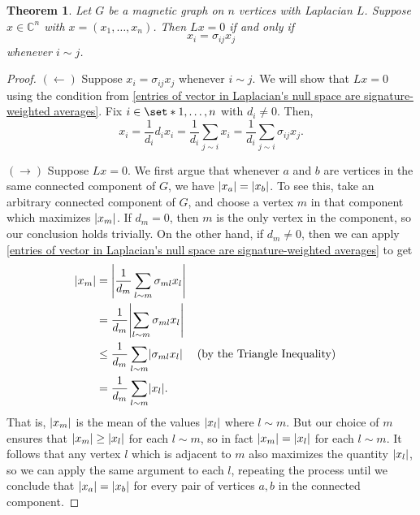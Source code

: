 \documentclass[12pt]{article}
\newtheorem{thm}{Theorem}
\theoremstyle{definition}
\newcommand{\C}{\mathbb C}
\DeclarePairedDelimiter\abs{\lvert}{\rvert}%
\begin{document}
\begin{thm}\label{characterization of null space of Laplacian}
Let $G$ be a magnetic graph on $n$ vertices with Laplacian $L$. Suppose $x \in \C^n$ with $x = (x_1, \dots, x_n)$. Then $Lx = 0$ if and only if
$$x_i = \sigma_{ij}x_j$$
whenever $i \sim j$.
\end{thm}
\begin{proof}
$(\leftarrow)$ Suppose $x_i = \sigma_{ij}x_j$ whenever $i \sim j$. We will show that $Lx = 0$ using the condition from \cref{entries of vector in Laplacian's null space are signature-weighted averages}. Fix $i \in \set*{1, \dots, n}$ with $d_i \neq 0$. Then,
$$
x_i 
= \frac{1}{d_i} d_i x_i
= \frac{1}{d_i} \sum_{j \sim i} x_i
= \frac{1}{d_i} \sum_{j \sim i} \sigma_{ij}x_j.
$$ 

$(\rightarrow)$ Suppose $Lx = 0$. We first argue that whenever $a$ and $b$ are vertices in the same connected component of $G$, we have $\abs*{x_a} = \abs*{x_b}$. To see this, take an arbitrary connected component of $G$, and choose a vertex $m$ in that component which maximizes $\abs*{x_m}$. If $d_m = 0$, then $m$ is the only vertex in the component, so our conclusion holds trivially. On the other hand, if $d_m \neq 0$, then we can apply \cref{entries of vector in Laplacian's null space are signature-weighted averages} to get
\begin{align*}
\abs*{x_m} &= \abs*{\frac{1}{d_m} \sum_{l \sim m} \sigma_{ml} x_l} \\
&= \frac{1}{d_m} \abs*{\sum_{l \sim m} \sigma_{ml} x_l} \\
&\leq \frac{1}{d_m} \sum_{l \sim m} \abs*{\sigma_{ml} x_l} && \text{(by the Triangle Inequality)} \\
&= \frac{1}{d_m} \sum_{l \sim m} \abs*{x_l}.
\end{align*}
That is, $\abs*{x_m}$ is the mean of the values $\abs{x_l}$ where $l \sim m$. But our choice of $m$ ensures that $\abs*{x_m} \geq \abs*{x_l}$ for each $l \sim m$, so in fact $\abs*{x_m} = \abs*{x_l}$ for each $l \sim m$. It follows that any vertex $l$ which is adjacent to $m$ also maximizes the quantity $\abs*{x_l}$, so we can apply the same argument to each $l$, repeating the process until we conclude that $\abs*{x_a} = \abs*{x_b}$ for every pair of vertices $a, b$ in the connected component.


\end{proof}
\end{document}

